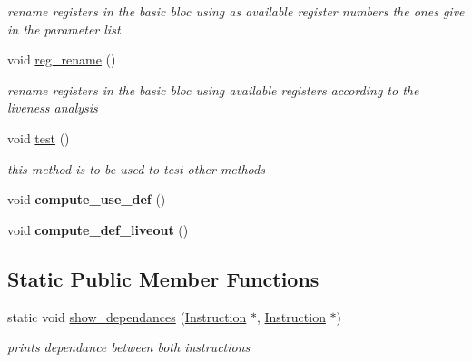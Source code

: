 \begin{DoxyCompactItemize}
\begin{DoxyCompactList}\small\item\em rename registers in the basic bloc using as available register numbers the ones give in the parameter list \end{DoxyCompactList}\item 
\hypertarget{class_basic__block_a1b6570f1c03c7f7435ab681c243151c9}{void \hyperlink{class_basic__block_a1b6570f1c03c7f7435ab681c243151c9}{reg\+\_\+rename} ()}\label{class_basic__block_a1b6570f1c03c7f7435ab681c243151c9}

\begin{DoxyCompactList}\small\item\em rename registers in the basic bloc using available registers according to the liveness analysis \end{DoxyCompactList}\item 
\hypertarget{class_basic__block_a0f26ff105216c62082905097b5dcebd3}{void \hyperlink{class_basic__block_a0f26ff105216c62082905097b5dcebd3}{test} ()}\label{class_basic__block_a0f26ff105216c62082905097b5dcebd3}

\begin{DoxyCompactList}\small\item\em this method is to be used to test other methods \end{DoxyCompactList}\item 
\hypertarget{class_basic__block_a7e91d5003b7941c50199ab22a8db0d17}{void {\bfseries compute\+\_\+use\+\_\+def} ()}\label{class_basic__block_a7e91d5003b7941c50199ab22a8db0d17}

\item 
\hypertarget{class_basic__block_a11eaa93c186fb46120bb6b0397e0c590}{void {\bfseries compute\+\_\+def\+\_\+liveout} ()}\label{class_basic__block_a11eaa93c186fb46120bb6b0397e0c590}

\end{DoxyCompactItemize}
\subsection*{Static Public Member Functions}
\begin{DoxyCompactItemize}
\item 
\hypertarget{class_basic__block_aef985f2438261d429f81c7b5d4de5f16}{static void \hyperlink{class_basic__block_aef985f2438261d429f81c7b5d4de5f16}{show\+\_\+dependances} (\hyperlink{class_instruction}{Instruction} $\ast$, \hyperlink{class_instruction}{Instruction} $\ast$)}\label{class_basic__block_aef985f2438261d429f81c7b5d4de5f16}

\begin{DoxyCompactList}\small\item\em prints dependance between both instructions \end{DoxyCompactList}\end{DoxyCompactItemize}
